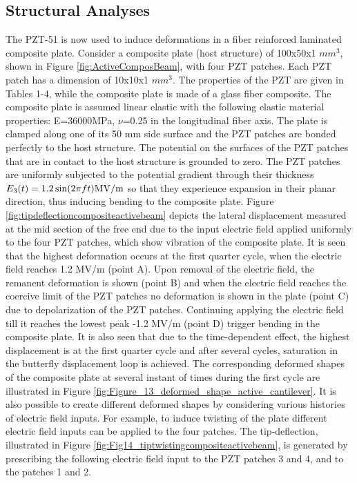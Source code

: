 \subsection{Structural Analyses}
The PZT-51 is now used to induce deformations in a fiber reinforced laminated composite plate. 
Consider a composite plate (host structure) of 100x50x1 $mm^3$, shown in Figure \ref{fig:ActiveComposBeam}, with four PZT patches. 
Each PZT patch has a dimension of 10x10x1 $mm^3$. 
The properties of the PZT are given in Tables 1-4, while the composite plate is made of a glass fiber composite. 
The composite plate is assumed linear elastic with the following elastic material properties: E=36000MPa, $\nu$=0.25 in the longitudinal fiber axis. 
The plate is clamped along one of its 50 mm side surface and the PZT patches are bonded perfectly to the host structure. 
The potential on the surfaces of the PZT patches that are in contact to the host structure is grounded to zero. 
The PZT patches are uniformly subjected to the potential gradient through their thickness ${E_3}(t) = 1.2\sin (2\pi ft){\rm{ MV/m}}$ so that they experience expansion in their planar direction, thus inducing bending to the composite plate. 
Figure \ref{fig:tipdeflectioncompositeactivebeam} depicts the lateral displacement measured at the mid section of the free end due to the input electric field applied uniformly to the four PZT patches, which show vibration of the composite plate. 
It is seen that the highest deformation occurs at the first quarter cycle, when the electric field reaches 1.2 MV/m (point A).  
Upon removal of the electric field, the remanent deformation is shown (point B) and when the electric field reaches the coercive limit of the PZT patches no deformation is shown in the plate (point C) due to depolarization of the PZT patches. 
Continuing applying the electric field till it reaches the lowest peak -1.2 MV/m (point D) trigger bending in the composite plate. 
It is also seen that due to the time-dependent effect, the highest displacement is at the first quarter cycle and after several cycles, saturation in the butterfly displacement loop is achieved. 
The corresponding deformed shapes of the composite plate at several instant of times during the first cycle are illustrated in Figure \ref{fig:Figure_13_deformed_shape_active_cantilever}. 
It is also possible to create different deformed shapes by considering various histories of electric field inputs. 
For example, to induce twisting of the plate different electric field inputs can be applied to the four patches. 
The tip-deflection, illustrated in Figure \ref{fig:Fig14_tiptwistingcompositeactivebeam}, is generated by prescribing the following electric field input to the PZT patches 3 and 4, and  to the patches 1 and 2.


